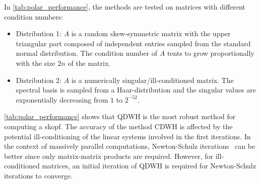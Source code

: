 \documentclass[final,onefignum,onetabnum,dvipsnames]{siamart251216}
\numberwithin{algorithm}{section}
\numberwithin{equation}{section}
\begin{document}
In \cref{tab:polar_performance}, the methods are tested on matrices with different condition numbers:
\begin{itemize}
    \item Distribution 1: $A$ is a random skew-symmetric matrix with the upper triangular part composed of independent entries sampled from the standard normal distribution. The condition number of $A$ tents to grow proportionally with the size $2n$ of the matrix.
    \item Distribution 2: $A$ is a numerically singular/ill-conditioned matrix. The spectral basis is sampled from a Haar-distribution and the singular values are exponentially decreasing from $1$ to $2^{-52}$.
\end{itemize}

\color{black}




\cref{tab:polar_performance} shows that QDWH is the most robust method for computing a skopf.  The accuracy of the method CDWH is affected by the potential ill-conditioning of the linear systems involved in the first iterations.
In the context of massively parallel computations, Newton-Schulz iterations~\cite{BjorckBowie1971} can be better since only matrix-matrix products are required. However, for ill-conditioned matrices, an initial iteration of QDWH is required for Newton-Schulz iterations to converge. 
\end{document}
